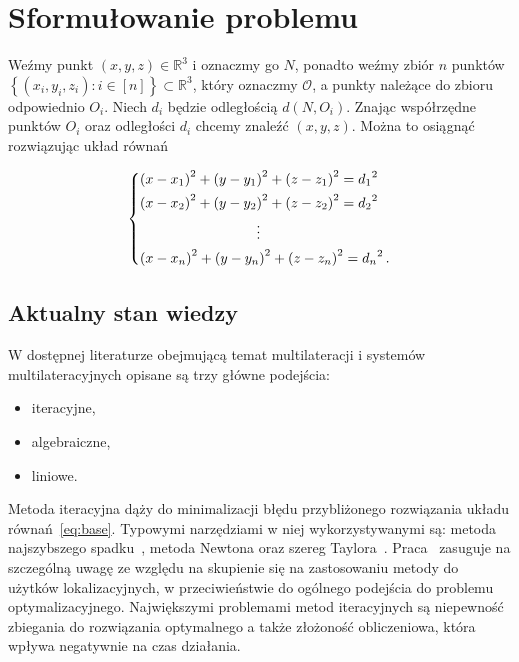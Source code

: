 \chapter{Sformułowanie problemu}\label{chap:problem}

Weźmy punkt $(x, y, z) \in \mathbb{R}^3$ i oznaczmy go $N$, ponadto weźmy zbiór $n$ punktów $\left\{(x_i, y_i, z_i): i \in [n]\right\} \subset \mathbb{R}^3$, który oznaczmy $\mathcal{O}$, a punkty należące do zbioru odpowiednio $O_i$. Niech $d_i$ będzie odległością $d(N, O_i)$. Znając współrzędne punktów $O_i$ oraz odległości $d_i$ chcemy znaleźć $(x, y, z)$. Można to osiągnąć rozwiązując układ równań

\begin{equation}\label{eq:base}
    \begin{dcases}
        {(x - x_1)}^2 + {(y - y_1)}^2 + {(z - z_1)}^2 = {d_1}^2 \\
        {(x - x_2)}^2 + {(y - y_2)}^2 + {(z - z_2)}^2 = {d_2}^2 \\
        \mspace{150mu}\vdots                                    \\
        {(x - x_n)}^2 + {(y - y_n)}^2 + {(z - z_n)}^2 = {d_n}^2\,.
    \end{dcases}
\end{equation}

\section{Aktualny stan wiedzy}

W dostępnej literaturze obejmującą temat multilateracji i systemów multilateracyjnych opisane są trzy główne podejścia:

\begin{itemize}
    \item iteracyjne,
    \item algebraiczne,
    \item liniowe.
\end{itemize}

Metoda iteracyjna dąży do minimalizacji błędu przybliżonego rozwiązania układu równań~\ref{eq:base}. Typowymi narzędziami w niej wykorzystywanymi są: metoda najszybszego spadku~\cite{doi:10.1137/0111030}, metoda Newtona oraz szereg Taylora~\cite{4101619}. Praca~\cite{4101619} zasuguje na szczególną uwagę ze względu na skupienie się na zastosowaniu metody do użytków lokalizacyjnych, w przeciwieństwie do ogólnego podejścia do problemu optymalizacyjnego. Największymi problemami metod iteracyjnych są niepewność zbiegania do rozwiązania optymalnego a także złożoność obliczeniowa, która wpływa negatywnie na czas działania.

